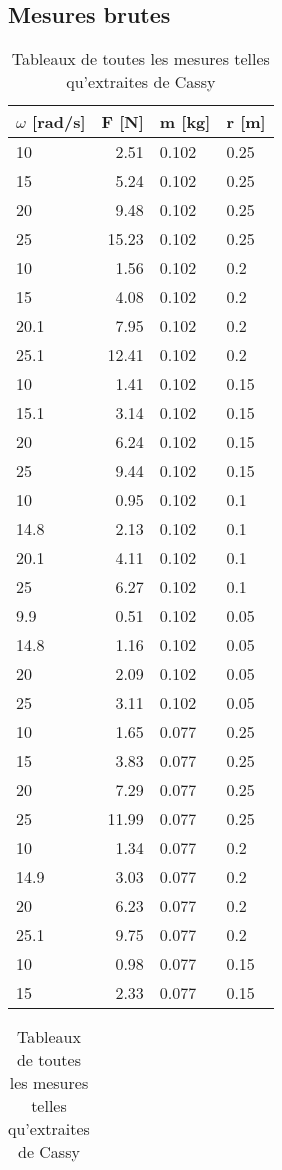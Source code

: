 \subsection{Mesures brutes}
\begin{table}
    \caption[Mesures brutes]{Tableaux de toutes les mesures telles qu'extraites de Cassy}
    \centering
    \begin{tabular}{|l|r|l|l|}
	\hline
	$\omega$ [rad/s] &F [N]	&m [kg]	&r [m]\\
	\hline
	10	&2.51	&0.102	&0.25 \\
	15	&5.24	&0.102	&0.25 \\
	20	&9.48	&0.102	&0.25 \\
	25	&15.23	&0.102	&0.25 \\
	10	&1.56	&0.102	&0.2  \\
	15	&4.08	&0.102	&0.2  \\
	20.1	&7.95	&0.102	&0.2  \\
	25.1	&12.41	&0.102	&0.2  \\
	10	&1.41	&0.102	&0.15 \\
	15.1	&3.14	&0.102	&0.15 \\
	20	&6.24	&0.102	&0.15 \\
	25	&9.44	&0.102	&0.15 \\
	10	&0.95	&0.102	&0.1  \\
	14.8	&2.13	&0.102	&0.1  \\
	20.1	&4.11	&0.102	&0.1  \\
	25	&6.27	&0.102	&0.1  \\
	9.9	&0.51	&0.102	&0.05 \\
	14.8	&1.16	&0.102	&0.05 \\
	20	&2.09	&0.102	&0.05 \\
	25	&3.11	&0.102	&0.05 \\
	10	&1.65	&0.077	&0.25 \\
	15	&3.83	&0.077	&0.25 \\
	20	&7.29	&0.077	&0.25 \\
	25	&11.99	&0.077	&0.25 \\
	10	&1.34	&0.077	&0.2  \\
	14.9	&3.03	&0.077	&0.2  \\
	20	&6.23	&0.077	&0.2  \\
	25.1	&9.75	&0.077	&0.2  \\
	10	&0.98	&0.077	&0.15 \\
	15	&2.33	&0.077	&0.15 \\
	\hline
    \end{tabular}
    \quad
    \begin{tabular}{|l|r|l|l|}

\end{tabular}
\end{table}
